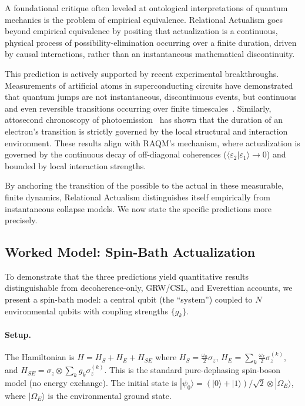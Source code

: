 \documentclass[11pt,a4paper]{article}
\theoremstyle{plain}
\theoremstyle{definition}
\theoremstyle{remark}
\newcommand{\braket}[2]{\langle #1 | #2 \rangle}
\begin{document}
A foundational critique often leveled at ontological interpretations of quantum
mechanics is the problem of empirical equivalence. Relational Actualism goes beyond
empirical equivalence by positing that actualization is a continuous, physical
process of possibility-elimination occurring over a finite duration, driven by
causal interactions, rather than an instantaneous mathematical discontinuity.

This prediction is actively supported by recent experimental breakthroughs.
Measurements of artificial atoms in superconducting circuits have demonstrated
that quantum jumps are not instantaneous, discontinuous events, but continuous and
even reversible transitions occurring over finite timescales~\citep{Minev2019}.
Similarly, attosecond chronoscopy of photoemission~\citep{Pazourek2015} has shown
that the duration of an electron's transition is strictly governed by the local
structural and interaction environment. These results align with RAQM's mechanism,
where actualization is governed by the continuous decay of off-diagonal coherences
($\braket{\varepsilon_2}{\varepsilon_1} \to 0$) and bounded by local interaction
strengths.

By anchoring the transition of the possible to the actual in these measurable,
finite dynamics, Relational Actualism distinguishes itself empirically from
instantaneous collapse models. We now state the specific predictions more
precisely.


\subsection{Worked Model: Spin-Bath Actualization}
\label{sec:spinbath}

To demonstrate that the three predictions yield quantitative results
distinguishable from decoherence-only, GRW/CSL, and Everettian accounts,
we present a spin-bath model: a central qubit (the ``system'') coupled to
$N$ environmental qubits with coupling strengths $\{g_k\}$.

\paragraph{Setup.}
The Hamiltonian is $H = H_S + H_E + H_{SE}$ where
$H_S = \tfrac{\omega_0}{2}\sigma_z$,
$H_E = \sum_k \tfrac{\omega_k}{2}\sigma_z^{(k)}$, and
$H_{SE} = \sigma_z \otimes \sum_k g_k \sigma_z^{(k)}$.
This is the standard pure-dephasing spin-boson model (no energy exchange).
The initial state is $|\psi_0\rangle = (|0\rangle + |1\rangle)/\sqrt{2}
\otimes |\Omega_E\rangle$, where $|\Omega_E\rangle$ is the environmental
ground state.
\end{document}
